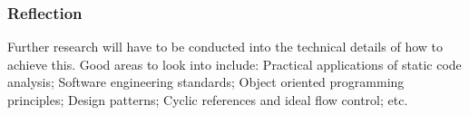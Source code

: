 \subsubsection{Reflection}
Further research will have to be conducted into the technical details of how to achieve this. Good areas to look into include: Practical applications of static code analysis; Software engineering standards; Object oriented programming principles; Design patterns; Cyclic references and ideal flow control; etc.
